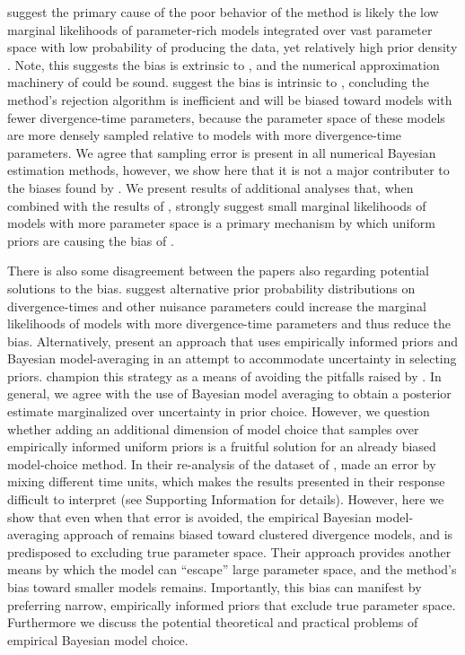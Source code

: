 \citet{Oaks2012} suggest the primary cause of the poor behavior of the method
is likely the low marginal likelihoods of parameter-rich models integrated over
vast parameter space with low probability of producing the data, yet relatively
high prior density \citep{Lindley1957}.
Note, this suggests the bias is extrinsic to \msb, and the numerical
approximation machinery of \msb could be sound.
\citet{Hickerson2013} suggest the bias is intrinsic to \msb, concluding the
method's rejection algorithm is inefficient and will be biased
toward models with fewer divergence-time parameters, because the parameter
space of these models are more densely sampled relative to models with more
divergence-time parameters.
We agree that sampling error is present in all numerical Bayesian estimation
methods, however, we show here that it is not a major contributer to the
biases found by \citet{Oaks2012}.
We present results of additional analyses that, when combined with
the results of \citet{Oaks2012}, strongly suggest small marginal likelihoods of
models with more parameter space is a primary mechanism by which uniform priors
are causing the bias of \msb.


There is also some disagreement between the papers also regarding potential
solutions to the bias.
\citet{Oaks2012} suggest alternative prior probability distributions on
divergence-times and other nuisance parameters could increase the marginal
likelihoods of models with more divergence-time parameters and thus reduce the
bias.
Alternatively, \citet{Hickerson2013} present an approach that uses empirically
informed priors and Bayesian model-averaging in an attempt to accommodate
uncertainty in selecting priors.
\citet{Hickerson2013} champion this strategy as a means of avoiding the
pitfalls raised by \citet{Oaks2012}.
In general, we agree with the use of Bayesian model averaging to obtain a
posterior estimate marginalized over uncertainty in prior choice.
However, we question whether adding an additional dimension of model choice
that samples over empirically informed uniform priors is a fruitful solution
for an already biased model-choice method.
In their re-analysis of the dataset of \citet{Oaks2012}, \citet{Hickerson2013}
made an error by mixing different time units, which makes the results presented
in their response difficult to interpret (see Supporting Information for
details).
However, here we show that even when that error is avoided, the empirical
Bayesian model-averaging approach of \citet{Hickerson2013} remains biased
toward clustered divergence models, and is predisposed to excluding true
parameter space.
Their approach provides another means by which the model can ``escape'' large
parameter space, and the method's bias toward smaller models remains.
Importantly, this bias can manifest by preferring narrow, empirically informed
priors that exclude true parameter space.
Furthermore we discuss the potential theoretical and practical problems of
empirical Bayesian model choice.

